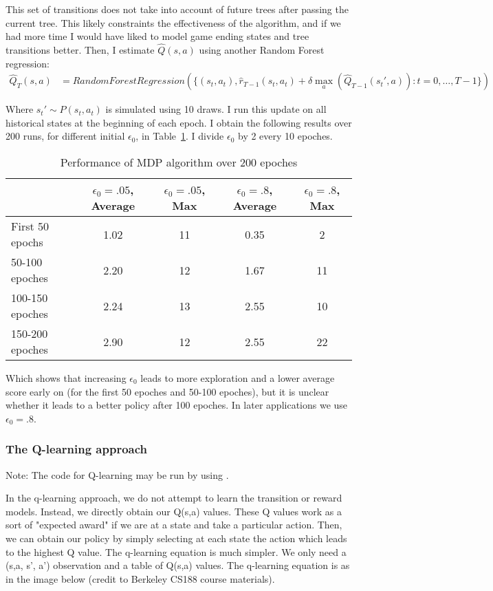 \documentclass[11pt]{article}
\begin{document}
This set of transitions does not take into account of future trees after passing the current tree. This likely constraints the effectiveness of the algorithm, and if we had more time I would have liked to model game ending states and tree transitions better. Then, I estimate $\hat{Q}(s,a)$ using another Random Forest regression:
\begin{align*}
    \hat{Q}_T(s,a) &= RandomForestRegression\left(\{(s_t, a_t), \hat{r}_{T-1}(s_t, a_t) + \delta \max_a(\hat{Q}_{T-1}(s_t',a))  : t=0, \ldots, T-1\} \right)
\end{align*}

Where $s_t' \sim P(s_t, a_t)$ is simulated using 10 draws. I run this update on all historical states at the beginning of each epoch. I obtain the following results over 200 runs, for different initial $\epsilon_0$, in Table~\ref{tab:MDP_calibration}. I divide $\epsilon_0$ by 2 every 10 epoches.
\begin{table}[H]
    \centering
    \caption{Performance of MDP algorithm over 200 epoches}\label{tab:MDP_calibration}
    \begin{tabular}{l|c|c|c|c}
         \hline \hline
         & $\epsilon_0=.05$, Average & $\epsilon_0=.05$, Max & $\epsilon_0 = .8$, Average & $\epsilon_0 = .8$, Max \\
         \hline 
    First 50 epochs   & 1.02 & 11 & 0.35 & 2 \\
    50-100 epoches    & 2.20 & 12 & 1.67 & 11 \\
    100-150 epoches   & 2.24 & 13 & 2.55 & 10 \\
    150-200 epoches   & 2.90 & 12 & 2.55 & 22 \\
    \hline
    \end{tabular}
\end{table}

Which shows that increasing $\epsilon_0$ leads to more exploration and a lower average score early on (for the first 50 epoches and 50-100 epoches), but it is unclear whether it leads to a better policy after 100 epoches. In later applications we use $\epsilon_0 = .8$.

\subsubsection{The Q-learning approach}

Note: The code for Q-learning may be run by using .

In the q-learning approach, we do not attempt to learn the transition or reward models. Instead, we directly obtain our Q(s,a) values. These Q values work as a sort of "expected award" if we are at a state and take a particular action. Then, we can obtain our policy by simply selecting at each state the action which leads to the highest Q value. The q-learning equation is much simpler. We only need a (s,a, s', a') observation and a table of Q(s,a) values. The q-learning equation is as in the image below (credit to Berkeley CS188 course materials).
\end{document}
